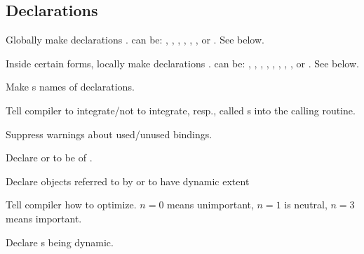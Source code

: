 \subsection{Declarations}
\begin{LIST}{1cm}

  Globally make declarations .  can be:
  ,      
  ,           
  ,   
  ,
  ,
  , or
  . See below.

  Inside certain forms, locally make declarations .  can be:
  ,
  ,           
  ,       
  ,     
  ,     
  ,  
  ,  
  , or
  . See below.      

  Make s names of declarations.

  Tell compiler to integrate/not to integrate, resp., called
  s into the calling routine.

  Suppress warnings about used/unused bindings.

  Declare  or  to be of .

  Declare objects referred to by  or  to have dynamic extent

  Tell compiler how to optimize. $n=0$ means unimportant, $n=1$ is
  neutral, $n=3$ means important.

  Declare s being dynamic.


\end{LIST}


